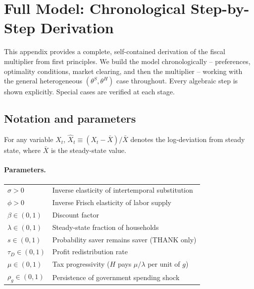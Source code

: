 \section{Full Model: Chronological Step-by-Step Derivation}\label{app:fullderivation}

This appendix provides a complete, self-contained derivation of the fiscal
multiplier from first principles. We build the model chronologically --
preferences, optimality conditions, market clearing, and then the multiplier
-- working with the general heterogeneous $(\theta^{S},\theta^{H})$ case
throughout. Every algebraic step is shown explicitly. Special cases are
verified at each stage.

\subsection{Notation and parameters}\label{app:notation}

For any variable $X_{t}$, $\hat X_{t}\equiv(X_{t}-\bar X)/\bar X$ denotes the
log-deviation from steady state, where $\bar X$ is the steady-state value.

\paragraph{Parameters.}
\begin{center}
\begin{tabular}{ll}
$\sigma>0$            & Inverse elasticity of intertemporal substitution\\
$\phi>0$              & Inverse Frisch elasticity of labor supply\\
$\beta\in(0,1)$       & Discount factor\\
$\lambda\in(0,1)$     & Steady-state fraction of \HtM{} households\\
$s\in(0,1)$           & Probability saver remains saver (THANK only)\\
$\tau_{D}\in(0,1)$    & Profit redistribution rate\\
$\mu\in(0,1)$         & Tax progressivity ($H$ pays $\mu/\lambda$ per unit of $g$)\\
$\rho_{g}\in(0,1)$    & Persistence of government spending shock\\
\end{tabular}
\end{center}

